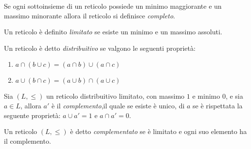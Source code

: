 \begin{defi}
    Se ogni sottoinsieme di un reticolo possiede un minimo maggiorante e un massimo minorante
    allora il reticolo si definisce \emph{completo}.
\end{defi}

\begin{defi}
    Un reticolo è definito \emph{limitato} se esiste un minimo e un massimo assoluti.
\end{defi}

\begin{defi}
    Un reticolo è detto \emph{distribuitivo} se valgono le seguenti proprietà:
\end{defi}
\begin{enumerate}
    \item $a \cap (b \cup c) = (a \cap b) \cup (a \cap c)$
    \item $a \cup (b \cap c) = (a \cup b) \cap (a \cup c)$
\end{enumerate}

\begin{defi}
    Sia $(L,\leq)$ un reticolo distribuitivo limitato, con massimo $1$ e minimo $0$,
e sia $a \in L$, allora $a'$ è il \emph{complemento},il quale se esiste è unico,
 di $a$ se è rispettata la seguente proprietà: $a \cup a' = 1$ e $a \cap a' = 0$.
\end{defi}

\begin{defi}
Un reticolo $(L,\leq)$ è detto \emph{complementato} se è limitato e ogni suo elemento ha il complemento.
\end{defi}

